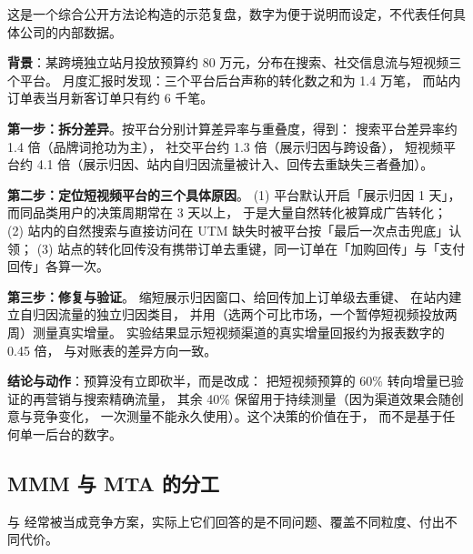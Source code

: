 \begin{casebox}
这是一个综合公开方法论构造的示范复盘，数字为便于说明而设定，不代表任何具体公司的内部数据。

\textbf{背景}：某跨境独立站月投放预算约 80 万元，分布在搜索、社交信息流与短视频三个平台。
月度汇报时发现：三个平台后台声称的转化数之和为 1.4 万笔，
而站内订单表当月新客订单只有约 6 千笔。

\textbf{第一步：拆分差异}。按平台分别计算差异率与重叠度，得到：
搜索平台差异率约 1.4 倍（品牌词抢功为主），
社交平台约 1.3 倍（展示归因与跨设备），
短视频平台约 4.1 倍（展示归因、站内自归因流量被计入、回传去重缺失三者叠加）。

\textbf{第二步：定位短视频平台的三个具体原因}。
(1) 平台默认开启「展示归因 1 天」，而同品类用户的决策周期常在 3 天以上，
于是大量自然转化被算成广告转化；
(2) 站内的自然搜索与直接访问在 UTM 缺失时被平台按「最后一次点击兜底」认领；
(3) 站点的转化回传没有携带订单去重键，同一订单在「加购回传」与「支付回传」各算一次。

\textbf{第三步：修复与验证}。
缩短展示归因窗口、给回传加上订单级去重键、
在站内建立自归因流量的独立归因类目，
并用（选两个可比市场，一个暂停短视频投放两周）测量真实增量。
实验结果显示短视频渠道的真实增量回报约为报表数字的 0.45 倍，
与对账表的差异方向一致。

\textbf{结论与动作}：预算没有立即砍半，而是改成：
把短视频预算的 60\% 转向增量已验证的再营销与搜索精确流量，
其余 40\% 保留用于持续测量（因为渠道效果会随创意与竞争变化，
一次测量不能永久使用）。这个决策的价值在于，
而不是基于任何单一后台的数字。
\end{casebox}

\subsection{MMM 与 MTA 的分工}

 与
经常被当成竞争方案，实际上它们回答的是不同问题、覆盖不同粒度、付出不同代价。

